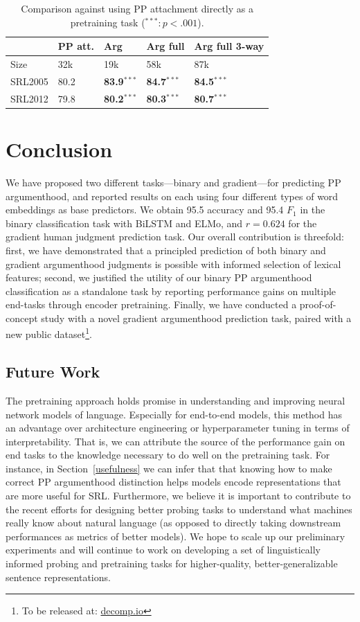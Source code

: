 \documentclass[letterpaper]{article} %
\begin{document}
\begin{table}[h]
	\begin{tabular}{@{}lllll@{}}
		\toprule
		 \hspace{1.2cm} & PP att. & Arg & Arg full & Arg full 3-way  \\ \midrule
		 Size & 32k & 19k & 58k & 87k  \\ \midrule
    	SRL2005   & 80.2  & \textbf{83.9$^{***}$} & \textbf{84.7$^{***}$} & \textbf{84.5$^{***}$}    \\
		SRL2012   & 79.8    & \textbf{80.2$^{***}$} & \textbf{80.3$^{***}$} & \textbf{80.7$^{***}$}    \\
		\bottomrule
	\end{tabular}
\caption{\normalsize Comparison against using PP attachment directly as a pretraining task ($^{***}: p<.001$).}
\label{exp:comparison}
\end{table}

\section{Conclusion}
We have proposed two different tasks---binary and gradient---for predicting PP argumenthood, and reported results on each using four different types of word embeddings as base predictors. We obtain 95.5 accuracy and 95.4 $F_1$ in the binary classification task with BiLSTM and ELMo, and $r=0.624$ for the gradient human judgment prediction task. Our overall contribution is threefold: first, we have demonstrated that a principled prediction of both binary and gradient argumenthood judgments is possible with informed selection of lexical features; second, we justified the utility of our binary PP argumenthood classification as a standalone task by reporting performance gains on multiple end-tasks through encoder pretraining. Finally, we have conducted a proof-of-concept study with a novel gradient argumenthood prediction task, paired with a new public dataset\footnote{To be released at: \url{decomp.io}}.

\subsection{Future Work}
The pretraining approach holds promise in understanding and improving neural network models of language. Especially for end-to-end models, this method has an advantage over architecture engineering or hyperparameter tuning in terms of interpretability. That is, we can attribute the source of the performance gain on end tasks to the knowledge necessary to do well on the pretraining task. For instance, in Section~\ref{usefulness} we can infer that that knowing how to make correct PP argumenthood distinction helps models encode representations that are more useful for SRL. Furthermore, we believe it is important to contribute to the recent efforts for designing better probing tasks to understand what machines really know about natural language (as opposed to directly taking downstream performances as metrics of better models). We hope to scale up our preliminary experiments and will continue to work on developing a set of linguistically informed probing and pretraining tasks for higher-quality, better-generalizable sentence representations.
\end{document}
